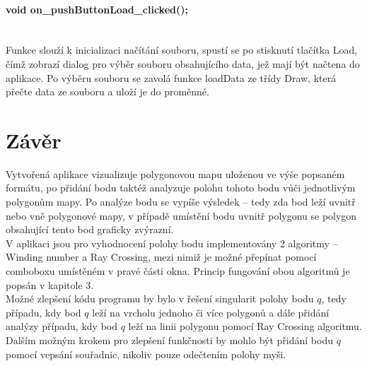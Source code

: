 \documentclass[11pt]{article}
\begin{document}
\paragraph{void on\_pushButtonLoad\_clicked();}\mbox{}\\
Funkce slouží k inicializaci načítání souboru, spustí se po stisknutí tlačítka Load, čímž zobrazí dialog pro výběr souboru obsahujícího data, jež mají být načtena do aplikace. Po výběru souboru se zavolá funkce loadData ze třídy Draw, která přečte data ze souboru a uloží je do proměnné.


\section{Závěr}
Vytvořená aplikace vizualizuje polygonovou mapu uloženou ve výše popsaném formátu, po přidání bodu taktéž analyzuje polohu tohoto bodu vůči jednotlivým polygonům mapy. Po analýze bodu se vypíše výsledek – tedy zda bod leží uvnitř nebo vně polygonové mapy, v případě umístění bodu uvnitř polygonu se polygon obsahující tento bod graficky zvýrazní.\\

 V aplikaci jsou pro vyhodnocení polohy bodu implementovány 2 algoritmy – Winding number a Ray Crossing, mezi nimiž je možné přepínat pomocí comboboxu umístěném v pravé části okna. Princip fungování obou algoritmů je popsán v kapitole 3. \\

Možné zlepšení kódu programu by bylo v řešení singularit polohy bodu $q$, tedy případu, kdy bod $q$ leží na vrcholu jednoho či více polygonů a dále přidání analýzy případu, kdy bod $q$ leží na linii polygonu pomocí Ray Crossing algoritmu. Dalším možným krokem pro zlepšení funkčnosti by mohlo být přidání bodu $q$ pomocí vepsání souřadnic, nikoliv pouze odečtením polohy myši.
\end{document}
